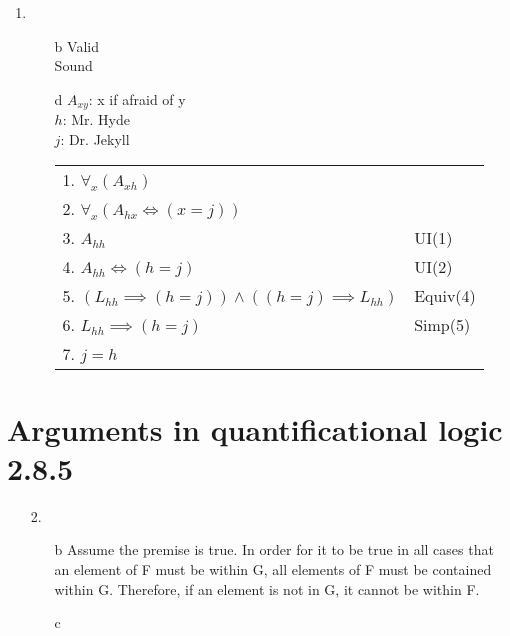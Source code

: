 \documentclass{article}
\begin{document}
\begin{enumerate}
\begin{enumerate}
			\end{enumerate}
		\item
			\begin{enumerate}
				\item[b]
					Valid\\
					Sound
				\item[d]
					$A_{xy}$: x if afraid of y\\ 
					$h$: Mr. Hyde\\
					$j$: Dr. Jekyll\\
					\begin{tabular}{l l}
						1. $\forall _x (A_{xh})$\\
						2. $\forall _x (A_{hx} \iff (x = j))$\\
						3. $A_{hh}$ & UI(1)\\
						4. $A_{hh} \iff (h = j)$ & UI(2)\\
						5. $(L_{hh} \implies (h = j)) \land ((h = j) \implies L_{hh})$ & Equiv(4)\\
						6. $L_{hh} \implies (h = j)$ & Simp(5)\\
						7. $j = h$
					\end{tabular}
			\end{enumerate}
	\end{enumerate}
	\section{Arguments in quantificational logic 2.8.5}
	\begin{enumerate}
		\item[2.]
			\begin{enumerate}
				\item[b]
					Assume the premise is true. In order for it to be true in all cases that an element of F must be within G, all elements of F must be contained within G. Therefore, if an element is not in G, it cannot be within F.
				\item[c]
	\end{enumerate}
\end{enumerate}
\end{document}
